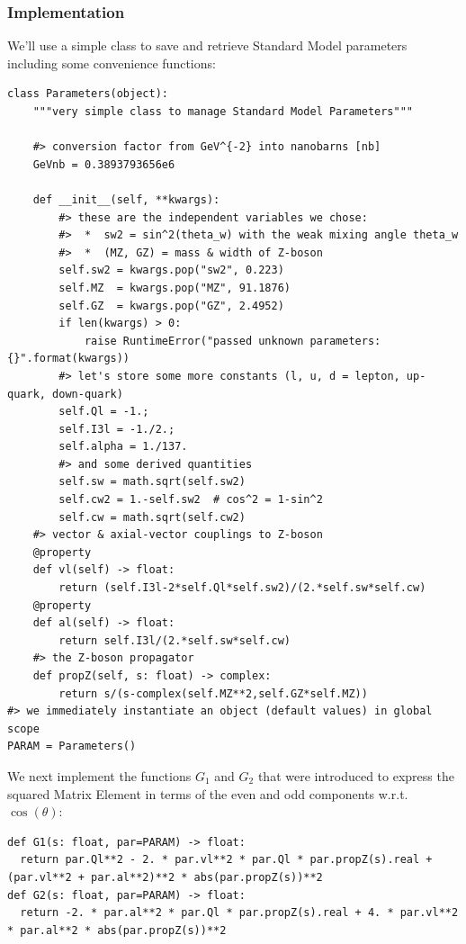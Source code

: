 \documentclass[11pt]{article}
\begin{document}
\subsubsection{Implementation}
\label{sec:org3e62154}
We'll use a simple class to save and retrieve Standard Model parameters including some convenience functions:
\begin{verbatim}
class Parameters(object):
    """very simple class to manage Standard Model Parameters"""

    #> conversion factor from GeV^{-2} into nanobarns [nb]
    GeVnb = 0.3893793656e6

    def __init__(self, **kwargs):
        #> these are the independent variables we chose:
        #>  *  sw2 = sin^2(theta_w) with the weak mixing angle theta_w
        #>  *  (MZ, GZ) = mass & width of Z-boson
        self.sw2 = kwargs.pop("sw2", 0.223)
        self.MZ  = kwargs.pop("MZ", 91.1876)
        self.GZ  = kwargs.pop("GZ", 2.4952)
        if len(kwargs) > 0:
            raise RuntimeError("passed unknown parameters: {}".format(kwargs))
        #> let's store some more constants (l, u, d = lepton, up-quark, down-quark)
        self.Ql = -1.;
        self.I3l = -1./2.;
        self.alpha = 1./137.
        #> and some derived quantities
        self.sw = math.sqrt(self.sw2)
        self.cw2 = 1.-self.sw2  # cos^2 = 1-sin^2
        self.cw = math.sqrt(self.cw2)
    #> vector & axial-vector couplings to Z-boson
    @property
    def vl(self) -> float:
        return (self.I3l-2*self.Ql*self.sw2)/(2.*self.sw*self.cw)
    @property
    def al(self) -> float:
        return self.I3l/(2.*self.sw*self.cw)
    #> the Z-boson propagator
    def propZ(self, s: float) -> complex:
        return s/(s-complex(self.MZ**2,self.GZ*self.MZ))
#> we immediately instantiate an object (default values) in global scope
PARAM = Parameters()
\end{verbatim}
We next implement the functions \(G_1\) and \(G_2\) that were introduced to express the squared Matrix Element in terms of the even and odd components w.r.t. \(\cos(\theta)\):
\begin{verbatim}
def G1(s: float, par=PARAM) -> float:
  return par.Ql**2 - 2. * par.vl**2 * par.Ql * par.propZ(s).real + (par.vl**2 + par.al**2)**2 * abs(par.propZ(s))**2
def G2(s: float, par=PARAM) -> float:
  return -2. * par.al**2 * par.Ql * par.propZ(s).real + 4. * par.vl**2 * par.al**2 * abs(par.propZ(s))**2
\end{verbatim}
\end{document}
